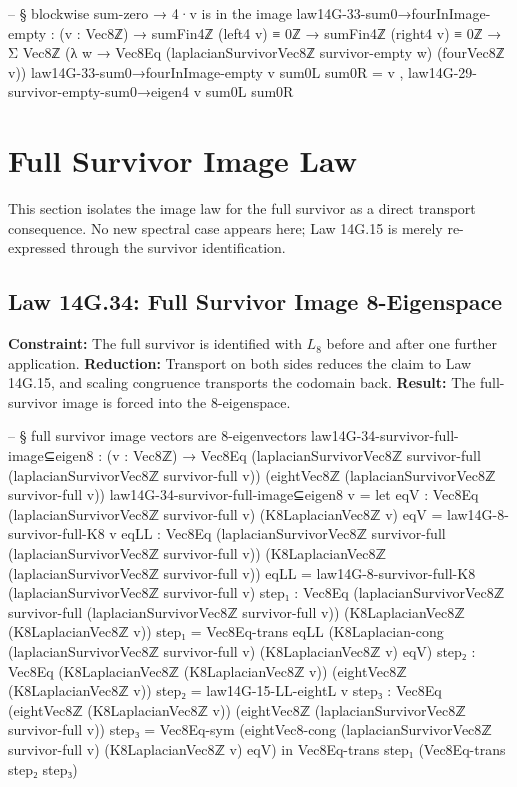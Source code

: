 \documentclass[11pt,a4paper]{book}
\def\subseteq{sub=}%
\def\texorpdfstring#1#2{#2}%
\begin{document}
\begin{code}
-- § blockwise sum-zero → 4·v is in the image
law14G-33-sum0→fourInImage-empty : (v : Vec8ℤ) → sumFin4ℤ (left4 v) ≡ 0ℤ → sumFin4ℤ (right4 v) ≡ 0ℤ →
  Σ Vec8ℤ (λ w → Vec8Eq (laplacianSurvivorVec8ℤ survivor-empty w) (fourVec8ℤ v))
law14G-33-sum0→fourInImage-empty v sum0L sum0R = v , law14G-29-survivor-empty-sum0→eigen4 v sum0L sum0R
\end{code}

\section{Full Survivor Image Law}

This section isolates the image law for the full survivor as a direct transport consequence.
No new spectral case appears here; Law 14G.15 is merely re-expressed through the survivor identification.

\subsection{Law 14G.34: Full Survivor Image \texorpdfstring{$\subseteq$}{} 8-Eigenspace}

\textbf{Constraint:} The full survivor is identified with $L_8$ before and after one further application.
\textbf{Reduction:} Transport on both sides reduces the claim to Law 14G.15, and scaling congruence transports the codomain back.
\textbf{Result:} The full-survivor image is forced into the $8$-eigenspace.

\begin{code}
-- § full survivor image vectors are 8-eigenvectors
law14G-34-survivor-full-image⊆eigen8 : (v : Vec8ℤ) →
  Vec8Eq (laplacianSurvivorVec8ℤ survivor-full (laplacianSurvivorVec8ℤ survivor-full v))
        (eightVec8ℤ (laplacianSurvivorVec8ℤ survivor-full v))
law14G-34-survivor-full-image⊆eigen8 v =
  let eqV : Vec8Eq (laplacianSurvivorVec8ℤ survivor-full v) (K8LaplacianVec8ℤ v)
      eqV = law14G-8-survivor-full-K8 v
      eqLL : Vec8Eq (laplacianSurvivorVec8ℤ survivor-full (laplacianSurvivorVec8ℤ survivor-full v))
                   (K8LaplacianVec8ℤ (laplacianSurvivorVec8ℤ survivor-full v))
      eqLL = law14G-8-survivor-full-K8 (laplacianSurvivorVec8ℤ survivor-full v)
      step₁ : Vec8Eq (laplacianSurvivorVec8ℤ survivor-full (laplacianSurvivorVec8ℤ survivor-full v))
                     (K8LaplacianVec8ℤ (K8LaplacianVec8ℤ v))
      step₁ =
        Vec8Eq-trans
          eqLL
          (K8Laplacian-cong (laplacianSurvivorVec8ℤ survivor-full v) (K8LaplacianVec8ℤ v) eqV)
      step₂ : Vec8Eq (K8LaplacianVec8ℤ (K8LaplacianVec8ℤ v)) (eightVec8ℤ (K8LaplacianVec8ℤ v))
      step₂ = law14G-15-LL-eightL v
      step₃ : Vec8Eq (eightVec8ℤ (K8LaplacianVec8ℤ v)) (eightVec8ℤ (laplacianSurvivorVec8ℤ survivor-full v))
      step₃ = Vec8Eq-sym (eightVec8-cong (laplacianSurvivorVec8ℤ survivor-full v) (K8LaplacianVec8ℤ v) eqV)
  in
  Vec8Eq-trans step₁ (Vec8Eq-trans step₂ step₃)
\end{code}
\end{document}
